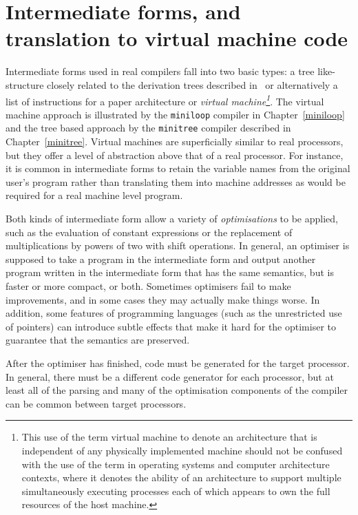 \section{Intermediate forms, and translation to virtual machine code}

Intermediate forms used in real compilers fall into two basic types: a
tree like-structure closely related to the derivation trees described
in~\cite{rdp:user:1.5} or alternatively a list of instructions for a
paper architecture or {\em virtual machine\/\footnote{This use of the term
virtual machine to denote an architecture that is independent of any
physically implemented machine should not be confused with the use of
the term in operating systems and computer architecture contexts, where
it denotes the ability of an architecture to support multiple
simultaneously executing processes each of which appears to own the full
resources of the host machine.}}. The virtual machine approach is illustrated by the
{\tt miniloop} compiler in Chapter~\ref{miniloop} and the tree based approach by
the {\tt minitree} compiler described in Chapter~\ref{minitree}.
Virtual machines are
superficially similar to real processors, but they offer a level of
abstraction above that of a real processor. For instance, it is common
in intermediate forms to retain the variable names from the original
user's program rather than translating them into machine addresses as
would be required for a real machine level program. 

Both kinds of intermediate form allow a variety of {\em optimisations}
to be applied, such as the evaluation of constant expressions or the
replacement of multiplications by powers of two with shift operations.
In general, an optimiser is supposed to take a program in the
intermediate form and output another program written in the intermediate
form that has the same semantics, but is faster or more compact, or both.
Sometimes optimisers fail to make improvements, and in some cases they
may actually make things worse. In addition, some features of
programming languages (such as the unrestricted use of pointers) can
introduce subtle effects that make it hard for the optimiser to
guarantee that the semantics are preserved.

After the optimiser has finished, code must be generated for the target
processor. In general, there must be a different code generator for
each processor, but at least all of the parsing and many of the optimisation
components of the compiler can be common between target processors.

